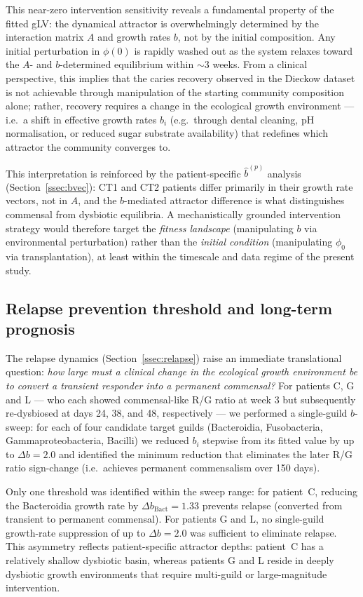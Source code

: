 \documentclass[11pt,a4paper]{article}
\begin{document}
This near-zero intervention sensitivity reveals a fundamental property of the
fitted gLV: the dynamical attractor is overwhelmingly determined by the
interaction matrix $A$ and growth rates $b$, not by the initial composition.
Any initial perturbation in $\phi(0)$ is rapidly washed out as the system
relaxes toward the $A$- and $b$-determined equilibrium within $\sim$3 weeks.
From a clinical perspective, this implies that the caries recovery observed
in the Dieckow dataset is not achievable through manipulation of the starting
community composition alone; rather, recovery requires a change in the
ecological growth environment — i.e.\ a shift in effective growth rates $b_i$
(e.g.\ through dental cleaning, pH normalisation, or reduced sugar substrate
availability) that redefines which attractor the community converges to.

This interpretation is reinforced by the patient-specific $\hat{b}^{(p)}$ analysis
(Section~\ref{ssec:bvec}): CT1 and CT2 patients differ primarily in their growth
rate vectors, not in $A$, and the $b$-mediated attractor difference is what
distinguishes commensal from dysbiotic equilibria.
A mechanistically grounded intervention strategy would therefore target the
\emph{fitness landscape} (manipulating $b$ via environmental perturbation)
rather than the \emph{initial condition} (manipulating $\phi_0$ via transplantation),
at least within the timescale and data regime of the present study.

\subsection{Relapse prevention threshold and long-term prognosis}
\label{ssec:prevention}

The relapse dynamics (Section~\ref{ssec:relapse}) raise an immediate translational question:
\emph{how large must a clinical change in the ecological growth environment be to convert a transient
responder into a permanent commensal?}
For patients C, G and L — who each showed commensal-like R/G ratio at week 3 but subsequently
re-dysbiosed at days 24, 38, and 48, respectively — we performed a single-guild $b$-sweep:
for each of four candidate target guilds (Bacteroidia, Fusobacteria, Gammaproteobacteria,
Bacilli) we reduced $b_i$ stepwise from its fitted value by up to $\Delta b = 2.0$ and
identified the minimum reduction that eliminates the later R/G ratio sign-change (i.e.\ achieves
permanent commensalism over 150 days).

Only one threshold was identified within the sweep range: for patient~C, reducing the
Bacteroidia growth rate by $\Delta b_\text{Bact} = 1.33$ prevents relapse (converted from
transient to permanent commensal). For patients G and L, no single-guild growth-rate
suppression of up to $\Delta b = 2.0$ was sufficient to eliminate relapse.
This asymmetry reflects patient-specific attractor depths: patient~C has a relatively
shallow dysbiotic basin, whereas patients G and L reside in deeply dysbiotic growth
environments that require multi-guild or large-magnitude intervention.
\end{document}
